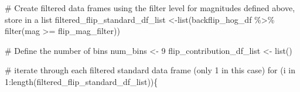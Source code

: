 \documentclass[
  letterpaper,
  DIV=11,
  numbers=noendperiod]{scrreprt}
\newenvironment{Shaded}{\begin{snugshade}}{\end{snugshade}}
\newcommand{\CommentTok}[1]{\textcolor[rgb]{0.37,0.37,0.37}{#1}}
\newcommand{\ControlFlowTok}[1]{\textcolor[rgb]{0.00,0.23,0.31}{#1}}
\newcommand{\DecValTok}[1]{\textcolor[rgb]{0.68,0.00,0.00}{#1}}
\newcommand{\FunctionTok}[1]{\textcolor[rgb]{0.28,0.35,0.67}{#1}}
\newcommand{\NormalTok}[1]{\textcolor[rgb]{0.00,0.23,0.31}{#1}}
\newcommand{\OtherTok}[1]{\textcolor[rgb]{0.00,0.23,0.31}{#1}}
\newcommand{\SpecialCharTok}[1]{\textcolor[rgb]{0.37,0.37,0.37}{#1}}
\begin{document}
\begin{Shaded}
\begin{Highlighting}[]
\CommentTok{\# Create filtered data frames using the filter level for magnitudes defined above, store in a list}
\NormalTok{filtered\_flip\_standard\_df\_list }\OtherTok{\textless{}{-}}\FunctionTok{list}\NormalTok{(backflip\_hog\_df }\SpecialCharTok{\%\textgreater{}\%}
                                        \FunctionTok{filter}\NormalTok{(mag }\SpecialCharTok{\textgreater{}=}\NormalTok{ flip\_mag\_filter))}
\end{Highlighting}
\end{Shaded}

\begin{Shaded}
\begin{Highlighting}[]
\CommentTok{\# Define the number of bins}
\NormalTok{num\_bins }\OtherTok{\textless{}{-}} \DecValTok{9}
\NormalTok{flip\_contribution\_df\_list }\OtherTok{\textless{}{-}} \FunctionTok{list}\NormalTok{()}

\CommentTok{\# iterate through each filtered standard data frame (only 1 in this case)}
\ControlFlowTok{for}\NormalTok{ (i }\ControlFlowTok{in} \DecValTok{1}\SpecialCharTok{:}\FunctionTok{length}\NormalTok{(filtered\_flip\_standard\_df\_list))\{}


\end{Highlighting}
\end{Shaded}
\end{document}
